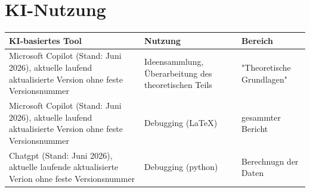 \chapter{KI-Nutzung}


\begin{table}[H]
\centering
\begin{tabular}{|p{5cm}|p{3cm}|p{3cm}|}
\hline
\textbf{KI-basiertes Tool} & \textbf{Nutzung} & \textbf{Bereich} \\
\hline
Microsoft Copilot (Stand: Juni 2026), aktuelle laufend aktualisierte Version ohne feste Versionsnummer 
& Ideensammlung, Überarbeitung des theoretischen Teils 
& "Theoretische Grundlagen" \\
\hline
Microsoft Copilot (Stand: Juni 2026), aktuelle laufend aktualisierte Version ohne feste Versionsnummer 
& Debugging (LaTeX) & gesammter Bericht \\
\hline
Chatgpt (Stand: Juni 2026),
aktuelle laufende aktualisierte Verion ohne feste Versionsnummer&Debugging (python) & Berechnugn der Daten\\
\hline
\end{tabular}
\end{table}
